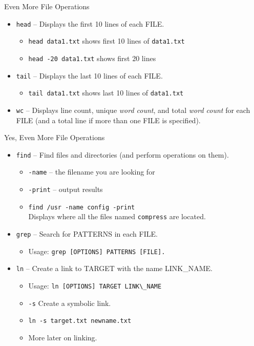\documentclass[14pt,aspectratio=1610]{beamer}
\begin{document}
\begin{frame}{Even More File Operations}
\begin{itemize}
\item \lstinline{head} -- Displays the first 10 lines of each FILE.
\begin{itemize}
\item \lstinline{head data1.txt} shows first 10 lines of \lstinline{data1.txt}
\item \lstinline{head -20 data1.txt} shows first 20 lines
\end{itemize}
\item \lstinline{tail} -- Displays the last 10 lines of each FILE.
\begin{itemize}
\item \lstinline{tail data1.txt} shows last 10 lines of \lstinline{data1.txt}
\end{itemize}
\item \lstinline{wc} -- Displays line count, unique \textit{word count}, and total \textit{word count} for each FILE (and a total line if more than one FILE is specified).
\end{itemize}
\end{frame}

\begin{frame}{Yes, Even More File Operations}
\begin{itemize}
  \item \lstinline{find} -- Find files and directories (and perform operations on them).
    \begin{itemize}
      \item \lstinline{-name}	-- the filename you are looking for
      \item \lstinline{-print} -- output results
      \item \lstinline{find /usr -name config -print}\\%
        Displays where all the files named \lstinline{compress} are located.
    \end{itemize}
  \item<2-> \lstinline{grep} -- Search for PATTERNS in each FILE.
    \begin{itemize}
      \item Usage: \lstinline{grep [OPTIONS] PATTERNS [FILE].}
    \end{itemize}
  \item<3-> \lstinline{ln} -- Create a link to TARGET with the name LINK\_NAME.
    \begin{itemize}
      \item Usage: \lstinline{ln [OPTIONS] TARGET LINK\_NAME}
      \item \lstinline{-s}  Create a symbolic link.
      \item \lstinline{ln -s target.txt newname.txt}
      \item More later on linking.
    \end{itemize}
\end{itemize}
\end{frame}
\end{document}
